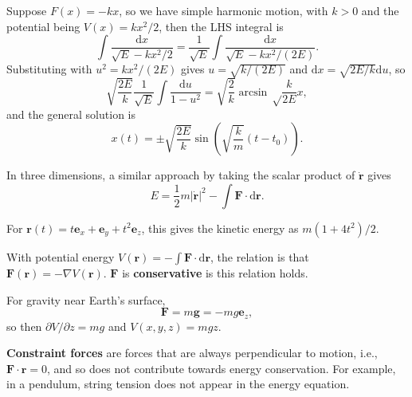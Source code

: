 \documentclass[letter-paper]{tufte-book}
\newenvironment{example}[1][Example]{\begin{trivlist}
\item[\hskip \labelsep {\bfseries #1}]}{\end{trivlist}}
\newcommand{\dy}{\partial}
\newcommand{\eb}{\boldsymbol{e}}
\newcommand{\Fb}{\boldsymbol{F}}
\newcommand{\rb}{\boldsymbol{r}}
\newcommand\Def[1]{\textbf{#1}}
\begin{document}
\begin{example}
  Suppose $F(x) = -kx$, so we have simple harmonic motion, with $k > 0$ and the
  potential being $V(x) = kx^2 / 2$, then the LHS integral is
  \begin{equation*}
    \int\frac{\mathrm{d}x}{\sqrt{E} - kx^2 /2} = 
    \frac{1}{\sqrt{E}}\int\frac{\mathrm{d}x}{\sqrt{E} - kx^2 / (2E)}.
  \end{equation*}
  Substituting with $u^2 = kx^2 / (2E)$ gives $u = \sqrt{k/(2E)}$ and
  $\mathrm{d}x = \sqrt{2E/k}\mathrm{d}u$, so
  \begin{equation*}
    \sqrt{\frac{2E}{k}}\frac{1}{\sqrt{E}} \int \frac{\mathrm{d}u}{1-u^2}
    = \sqrt{\frac{2}{k}}\arcsin\sqrt\frac{k}{2E}x,
  \end{equation*}
  and the general solution is
  \begin{equation*}
    x(t) = \pm \sqrt{\frac{2E}{k}}\sin\left(\sqrt{\frac{k}{m}}(t - t_0)\right).
  \end{equation*}
\end{example}

In three dimensions, a similar approach by taking the scalar product of
$\dot{\rb}$ gives
\begin{equation*}
  E = \frac{1}{2}m|\dot{\rb}|^2 - \int \Fb\cdot\mathrm{d}\rb.
\end{equation*}
\begin{example}
  For $\rb(t) = t\eb_x + \eb_y + t^2 \eb_z$, this gives the kinetic energy as
  $m(1+4t^2)/2$.
\end{example}

With potential energy $V(\rb) = -\int \Fb \cdot \mathrm{d}\rb$, the relation is
that $\Fb(\rb) = -\nabla V(\rb)$. $\Fb$ is \Def{conservative} is this
relation holds.

\begin{example}
  For gravity near Earth's surface,
  \begin{equation*}
    \Fb = m\boldsymbol{g} = -mg\eb_z,
  \end{equation*}
  so then $\dy V/\dy z = mg$ and $V(x,y,z) = mgz$.
\end{example}

\Def{Constraint forces} are forces that are always perpendicular to motion,
i.e., $\Fb\cdot\rb = 0$, and so does not contribute towards energy conservation.
For example, in a pendulum, string tension does not appear in the energy
equation.
\end{document}
